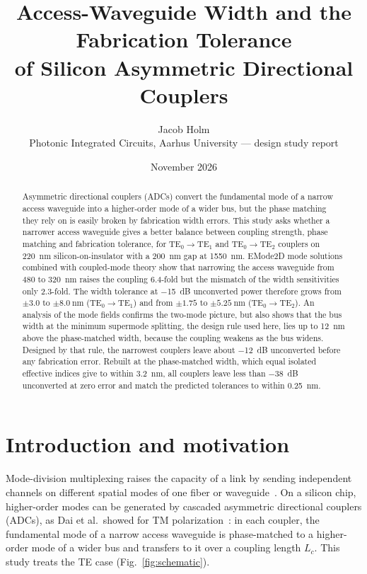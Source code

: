 \documentclass[11pt,a4paper]{article}
\title{Access-Waveguide Width and the Fabrication Tolerance\\
       of Silicon Asymmetric Directional Couplers}
\author{Jacob Holm\\  %
        \small Photonic Integrated Circuits, Aarhus University --- design study report}
\date{November 2026}
\newcommand{\TE}[1]{TE$_{#1}$}
\begin{document}
\maketitle

\begin{abstract}
\noindent
Asymmetric directional couplers (ADCs) convert the fundamental mode of a narrow access
waveguide into a higher-order mode of a wider bus, but the phase matching they rely on is
easily broken by fabrication width errors. This study asks whether a narrower access
waveguide gives a better balance between coupling strength, phase matching and
fabrication tolerance, for \TE{0}$\to$\TE{1} and \TE{0}$\to$\TE{2} couplers on
\qty{220}{\nm} silicon-on-insulator with a \qty{200}{\nm} gap at \qty{1550}{\nm}.
EMode2D mode solutions combined with coupled-mode theory show that narrowing the access
waveguide from 480 to \qty{320}{\nm} raises the coupling 6.4-fold
but the mismatch of the width sensitivities only 2.3-fold. The width tolerance at
\qty{-15}{\dB} unconverted power therefore grows from $\pm3.0$ to $\pm\qty{8.0}{\nm}$
(\TE{0}$\to$\TE{1}) and from $\pm1.75$ to $\pm\qty{5.25}{\nm}$ (\TE{0}$\to$\TE{2}). An
analysis of the mode fields confirms the two-mode picture, but also shows that the bus
width at the minimum supermode splitting, the design rule used here, lies up to
\qty{12}{\nm} above the phase-matched width, because the coupling weakens as the bus
widens. Designed by that rule, the narrowest couplers leave about \qty{-12}{\dB}
unconverted before any fabrication error. Rebuilt at the phase-matched width, which equal
isolated effective indices give to within \qty{3.2}{\nm}, all couplers leave less than
\qty{-38}{\dB} unconverted at zero error and match the predicted tolerances to within
\qty{0.25}{\nm}.
\end{abstract}

\section{Introduction and motivation}

Mode-division multiplexing raises the capacity of a link by sending independent channels
on different spatial modes of one fiber or waveguide~\citep{puttnam2021sdm}. On a silicon
chip, higher-order modes can be generated by cascaded asymmetric directional couplers
(ADCs), as Dai et al.\ showed for TM polarization~\citep{dai2013mode}: in each
coupler, the fundamental mode of a narrow access waveguide is phase-matched to a
higher-order mode of a wider bus and transfers to it over a coupling length $L_c$. This
study treats the TE case (Fig.~\ref{fig:schematic}).
\end{document}

